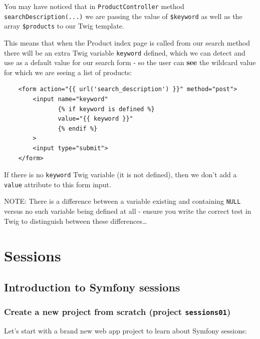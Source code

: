 \documentclass[a4paperpaper,openright]{book}
\newenvironment{Shaded}{}{}
\newcommand{\ExtensionTok}[1]{#1}
\newcommand{\NormalTok}[1]{#1}
\begin{document}
You may have noticed that in \texttt{ProductController} method
\texttt{searchDescription(...)} we are passing the value of
\texttt{\$keyword} as well as the array \texttt{\$products} to our Twig
template.

This means that when the Product index page is called from our search
method there will be an extra Twig variable \texttt{keyword} defined,
which we can detect and use as a default value for our search form - so
the user can \textbf{see} the wildcard value for which we are seeing a
list of products:

\begin{verbatim}
    <form action="{{ url('search_description') }}" method="post">
        <input name="keyword"
               {% if keyword is defined %}
               value="{{ keyword }}"
               {% endif %}
        >
        <input type="submit">
    </form>
\end{verbatim}

If there is no \texttt{keyword} Twig variable (it is not defined), then
we don't add a \texttt{value} attribute to this form input.

NOTE: There is a difference between a variable existing and containing
\texttt{NULL} versus no such variable being defined at all - ensure you
write the correct test in Twig to distinguish between these
differences\ldots{}

\part{Sessions}

\hypertarget{introduction-to-symfony-sessions}{%
\chapter{Introduction to Symfony
sessions}\label{introduction-to-symfony-sessions}}

\hypertarget{create-a-new-project-from-scratch-project-sessions01}{%
\section{\texorpdfstring{Create a new project from scratch (project
\texttt{sessions01})}{Create a new project from scratch (project sessions01)}}\label{create-a-new-project-from-scratch-project-sessions01}}

Let's start with a brand new web app project to learn about Symfony
sessions:

\begin{Shaded}
\end{Shaded}
\end{document}
